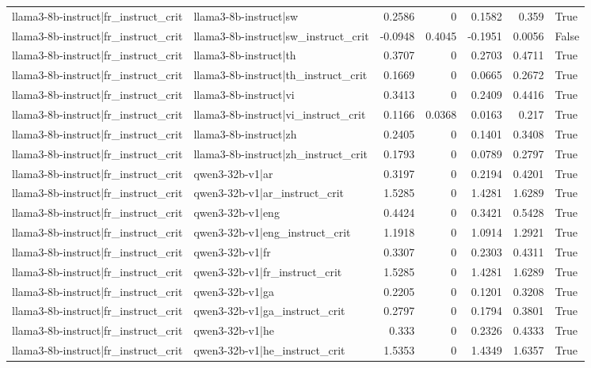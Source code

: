 \begin{table}
\begin{tabular}{l l r r r r l}
llama3-8b-instruct|fr_instruct_crit & llama3-8b-instruct|sw & 0.2586 & 0 & 0.1582 & 0.359 & True \\
llama3-8b-instruct|fr_instruct_crit & llama3-8b-instruct|sw_instruct_crit & -0.0948 & 0.4045 & -0.1951 & 0.0056 & False \\
llama3-8b-instruct|fr_instruct_crit & llama3-8b-instruct|th & 0.3707 & 0 & 0.2703 & 0.4711 & True \\
llama3-8b-instruct|fr_instruct_crit & llama3-8b-instruct|th_instruct_crit & 0.1669 & 0 & 0.0665 & 0.2672 & True \\
llama3-8b-instruct|fr_instruct_crit & llama3-8b-instruct|vi & 0.3413 & 0 & 0.2409 & 0.4416 & True \\
llama3-8b-instruct|fr_instruct_crit & llama3-8b-instruct|vi_instruct_crit & 0.1166 & 0.0368 & 0.0163 & 0.217 & True \\
llama3-8b-instruct|fr_instruct_crit & llama3-8b-instruct|zh & 0.2405 & 0 & 0.1401 & 0.3408 & True \\
llama3-8b-instruct|fr_instruct_crit & llama3-8b-instruct|zh_instruct_crit & 0.1793 & 0 & 0.0789 & 0.2797 & True \\
llama3-8b-instruct|fr_instruct_crit & qwen3-32b-v1|ar & 0.3197 & 0 & 0.2194 & 0.4201 & True \\
llama3-8b-instruct|fr_instruct_crit & qwen3-32b-v1|ar_instruct_crit & 1.5285 & 0 & 1.4281 & 1.6289 & True \\
llama3-8b-instruct|fr_instruct_crit & qwen3-32b-v1|eng & 0.4424 & 0 & 0.3421 & 0.5428 & True \\
llama3-8b-instruct|fr_instruct_crit & qwen3-32b-v1|eng_instruct_crit & 1.1918 & 0 & 1.0914 & 1.2921 & True \\
llama3-8b-instruct|fr_instruct_crit & qwen3-32b-v1|fr & 0.3307 & 0 & 0.2303 & 0.4311 & True \\
llama3-8b-instruct|fr_instruct_crit & qwen3-32b-v1|fr_instruct_crit & 1.5285 & 0 & 1.4281 & 1.6289 & True \\
llama3-8b-instruct|fr_instruct_crit & qwen3-32b-v1|ga & 0.2205 & 0 & 0.1201 & 0.3208 & True \\
llama3-8b-instruct|fr_instruct_crit & qwen3-32b-v1|ga_instruct_crit & 0.2797 & 0 & 0.1794 & 0.3801 & True \\
llama3-8b-instruct|fr_instruct_crit & qwen3-32b-v1|he & 0.333 & 0 & 0.2326 & 0.4333 & True \\
llama3-8b-instruct|fr_instruct_crit & qwen3-32b-v1|he_instruct_crit & 1.5353 & 0 & 1.4349 & 1.6357 & True \\

\end{tabular}
\end{table}
